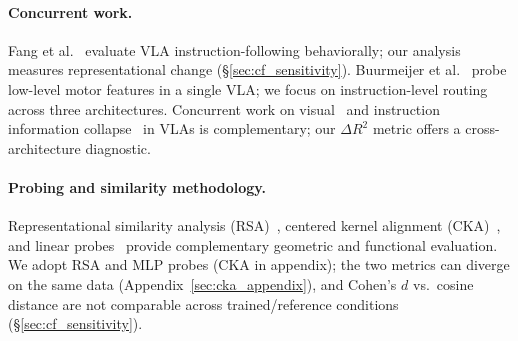 \paragraph{Concurrent work.}
Fang et al.~\cite{fang2026when} evaluate VLA instruction-following behaviorally; our analysis measures representational change (\S\ref{sec:cf_sensitivity}).
Buurmeijer et al.~\cite{buurmeijer2026} probe low-level motor features in a single VLA; we focus on instruction-level routing across three architectures.
Concurrent work on visual~\cite{kachaev2025dont} and instruction information collapse~\cite{lian2026bayesianvla} in VLAs is complementary; our $\Delta R^2$ metric offers a cross-architecture diagnostic.

\paragraph{Probing and similarity methodology.}
Representational similarity analysis (RSA)~\cite{kriegeskorte2008}, centered kernel alignment (CKA)~\cite{kornblith2019}, and linear probes~\cite{alain2017,belinkov2022} provide complementary geometric and functional evaluation.
We adopt RSA and MLP probes (CKA in appendix); the two metrics can diverge on the same data (Appendix~\ref{sec:cka_appendix}), and Cohen's $d$ vs.\ cosine distance are not comparable across trained/reference conditions (\S\ref{sec:cf_sensitivity}).

